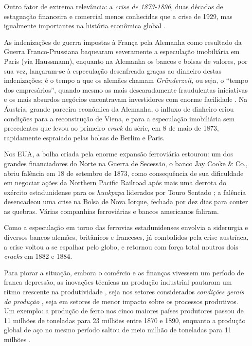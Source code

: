 Outro fator de extrema relevância: a \textit{crise de 1873-1896}, duas décadas de estagnação financeira e comercial menos conhecidas que a crise de 1929, mas igualmente importantes na história econômica global \cite{Fels1949,Fels1951,hobsbawm_empire_1989,Musson1959,Rezneck1950,Sprague1910,Persons1920}. 

As indenizações de guerra impostas à França pela Alemanha como resultado da Guerra Franco-Prussiana baquearam severamente a especulação imobiliária em Paris (via Haussmann), enquanto na Alemanha os bancos e bolsas de valores, por sua vez, lançaram-se à especulação desenfreada graças ao dinheiro destas indenizações; é o tempo a que os alemães chamam \textit{Gründerzeit}, ou seja, o ``tempo dos empresários'', quando mesmo as mais descaradamente fraudulentas iniciativas e os mais absurdos negócios encontravam investidores com enorme facilidade \cite[p.~61]{hobsbawm_capital_1977}. Na Áustria, grande parceira econômica da Alemanha, o influxo de dinheiro criou condições para a reconstrução de Viena, e para a especulação imobiliária sem precedentes que levou ao primeiro \textit{crack} da série, em 8 de maio de 1873, rapidamente espraiado pelas bolsas de Berlim e Paris.

Nos EUA, a bolha criada pela enorme expansão ferroviária estourou: um dos grandes financiadores do Norte na Guerra de Secessão, o banco Jay Cooke \& Co., abriu falência em 18 de setembro de 1873, como consequência de sua dificuldade em negociar ações da Northern Pacific Railroad após mais uma derrota do exército estadunidense para os \textit{hunkpapa} liderados por Touro Sentado \cite[p.~241-242]{utley_frontier_1973}; a falência desencadeou uma crise na Bolsa de Nova Iorque, fechada por dez dias para conter as quebras. Várias companhias ferroviárias e bancos americanos faliram. 

Como a especulação em torno das ferrovias estadunidenses envolvia a siderurgia e diversos bancos alemães, britânicos e franceses, já combalidos pela crise austríaca, a crise voltou a se espalhar pelo globo, e retornou com força total noutros dois \textit{cracks} em 1882 e 1884.

Para piorar a situação, embora o comércio e as finanças vivessem um período de franca depressão, as inovações técnicas na produção industrial pautaram um ritmo crescente na produtividade \cite{hobsbawm_empire_1989}, seja nos setores considerados \textit{condições gerais da produção} \cite[p.~155-162]{BERNARDO1991}, seja em setores de menor impacto sobre os processos produtivos. Um exemplo: a produção de ferro nos cinco maiores países produtores passou de 11 milhões de toneladas para 23 milhões entre 1870 e 1890, enquanto a produção global de aço no mesmo período saltou de meio milhão de toneladas para 11 milhões \cite[p.~35]{hobsbawm_empire_1989}.

